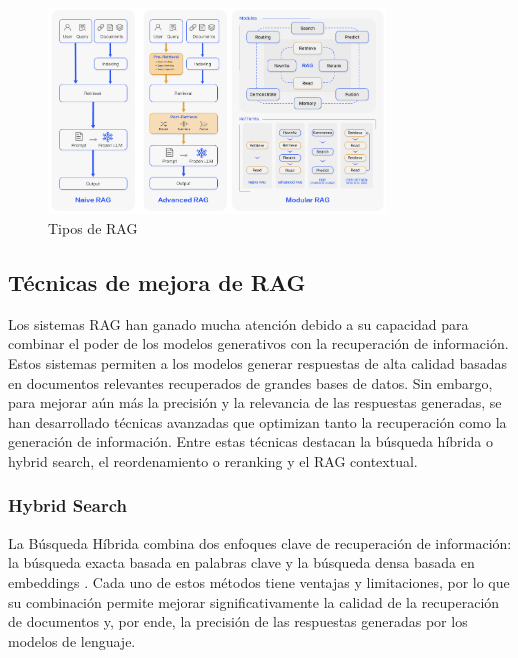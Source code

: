 \begin{figure}[h]
	\centering
	\includegraphics[width=0.8\textwidth]{figs/rag_types.png}
	\caption{Tipos de RAG}
	\label{fig:context-anoni1}
\end{figure}


\subsection{Técnicas de mejora de RAG}
Los sistemas RAG han ganado mucha atención debido a su capacidad para combinar el poder de los modelos generativos con la recuperación de información. 
Estos sistemas permiten a los modelos generar respuestas de alta calidad basadas en documentos relevantes recuperados de grandes bases de datos. 
Sin embargo, para mejorar aún más la precisión y la relevancia de las respuestas generadas, se han desarrollado técnicas avanzadas que optimizan tanto la recuperación como la generación de información. 
Entre estas técnicas destacan la búsqueda híbrida o hybrid search, el reordenamiento o reranking y el RAG contextual.


\subsubsection{Hybrid Search}
La Búsqueda Híbrida combina dos enfoques clave de recuperación de información: la búsqueda exacta basada en palabras clave y la búsqueda densa basada en embeddings \cite{hybridsearch}. 
Cada uno de estos métodos tiene ventajas y limitaciones, por lo que su combinación permite mejorar significativamente la calidad de la recuperación de documentos y, por ende, la precisión de las respuestas generadas por los modelos de lenguaje.


